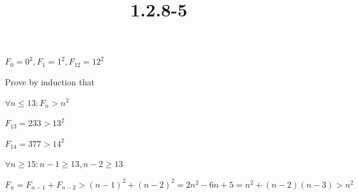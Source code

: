 \documentclass{article}
\title{1.2.8-5}
\begin{document}
\maketitle

\( F_0 = 0^2, F_1 = 1^2, F_{12} = 12^2 \)

Prove by induction that

\( \forall n \leq 13: F_n > n^2 \)

\( F_{13} = 233 > 13^2 \)

\( F_{14} = 377 > 14^2 \)

\( \forall n \geq 15: n - 1 \geq 13, n - 2 \geq 13 \)

\( F_n = F_{n-1} + F_{n-2} > (n - 1)^2 + (n - 2)^2 = 2n^2-6n+5 = n^2 + (n-2)(n-3) > n^2 \)
\end{document}
